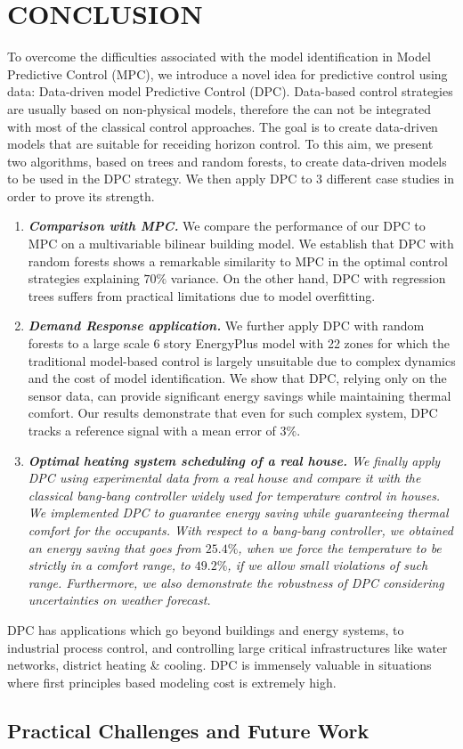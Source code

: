 \section{CONCLUSION}
\label{S:conclusion}

To overcome the difficulties associated with the model identification in Model Predictive Control (MPC), we introduce a novel idea for predictive control using data: Data-driven model Predictive Control (DPC). Data-based control strategies are usually based on non-physical models, therefore the can not be integrated with most of the classical control approaches. The goal is to create data-driven models that are suitable for receiding horizon control. To this aim, we present two algorithms, based on trees and random forests, to create data-driven models to be used in the DPC strategy. We then apply DPC to $3$ different case studies in order to prove its strength.
\begin{enumerate}
\item \emph{\textbf{Comparison with MPC.}} We compare the performance of our DPC to MPC on a multivariable bilinear building model. We establish that DPC with random forests shows a remarkable similarity to MPC in the optimal control strategies explaining $70\%$ variance. On the other hand, DPC with regression trees suffers from practical limitations due to model overfitting.
\item \emph{\textbf{Demand Response application.}} We further apply DPC with random forests to a large scale 6 story EnergyPlus model with 22 zones for which the traditional model-based control is largely unsuitable due to complex dynamics and the cost of model identification. We show that DPC, relying only on the sensor data, can provide significant energy savings while maintaining thermal comfort. Our results demonstrate that even for such complex system, DPC tracks a reference signal with a mean error of $3\%$.
\item \emph{\textbf{\textcolor[rgb]{0,0,1}{Optimal heating system scheduling of a real house.}} We finally apply DPC using experimental data from a real house and compare it with the classical bang-bang controller widely used for temperature control in houses. We implemented DPC to guarantee energy saving while guaranteeing thermal comfort for the occupants. With respect to a bang-bang controller, we obtained an energy saving that goes from $25.4\%$, when we force the temperature to be strictly in a comfort range, to $49.2\%$, if we allow small violations of such range. Furthermore, we also demonstrate the robustness of DPC considering uncertainties on weather forecast.}
\end{enumerate}

DPC has applications which go beyond buildings and energy systems, to industrial process control, and controlling large critical infrastructures like water networks, district heating \& cooling. DPC is immensely valuable in situations where first principles based modeling cost is extremely high.

\subsection{Practical Challenges and Future Work}
\label{SS:challenges}

